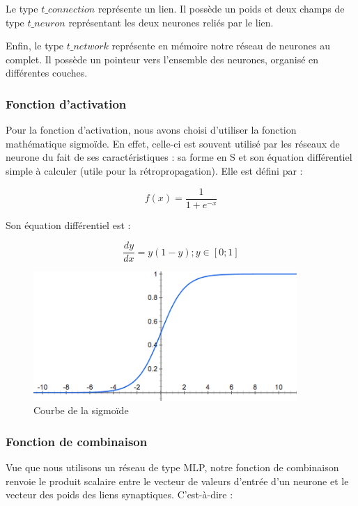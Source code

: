 \documentclass[11pt]{report}
\begin{document}
Le type $t\_connection$ représente un lien. Il possède un poids et deux champs de type $t\_neuron$ représentant les deux neurones reliés par le lien.

Enfin, le type $t\_network$ représente en mémoire notre réseau de neurones au complet. Il possède un pointeur vers l'ensemble des neurones, organisé en différentes couches.

\bigskip



\subsubsection{Fonction d'activation}

Pour la fonction d'activation, nous avons choisi d'utiliser la fonction mathématique sigmoïde. En effet, celle-ci est souvent utilisé par les réseaux de neurone du fait de ses caractéristiques : sa forme en S et son équation différentiel simple à calculer (utile pour la rétropropagation). Elle est défini par :

\[ f\left( x\right) = \dfrac{1}{1+e^{-x}} \]

Son équation différentiel est :

\[ \dfrac{dy}{dx} = y\left(1-y\right) ; y \in [0; 1] \]

\begin{figure}[htbp]
\centering
\includegraphics[width=10cm]{sigmoide.png}
\caption{Courbe de la sigmoïde}
\end{figure}

\subsubsection{Fonction de combinaison}

Vue que nous utilisons un réseau de type MLP, notre fonction de combinaison renvoie le produit scalaire entre le vecteur de valeurs d'entrée d'un neurone et le vecteur des poids des liens synaptiques. C'est-à-dire :
\end{document}
